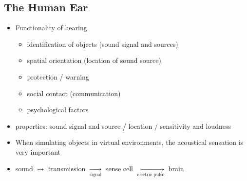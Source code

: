\documentclass{standalone}
\begin{document}
\subsection{The Human Ear}
\begin{itemize}
	\item Functionality of hearing
		\begin{itemize}
			\item identification of objects (sound signal and sources)
			\item spatial orientation (location of sound source)
			\item protection / warning
			\item social contact (communication)
			\item psychological factors
		\end{itemize}
	\item properties: sound signal and source / location / sensitivity and loudness
	\item When simulating objects in virtual environments, the acoustical sensation is very important
	\item sound $\rightarrow$ transmission $\xrightarrow[\text{signal}]{}$ sense cell $\xrightarrow[\text{electric pulse}]{}$ brain 
\end{itemize}

\setcounter{subsubsection}{1}
\end{document}
